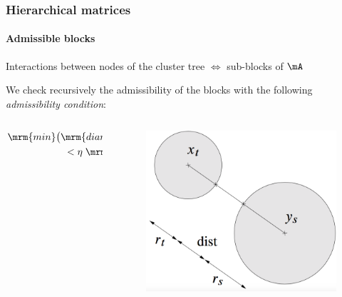\begin{frame}
\frametitle{Hierarchical matrices}
\framesubtitle{Admissible blocks }

Interactions between nodes of the cluster tree $\Leftrightarrow$ sub-blocks of $\mA$
\bigskip


We check recursively the admissibility of the blocks with the following \emph{admissibility condition}:
\begin{columns}
\begin{column}{0.5\textwidth}
\begin{align*}
\mrm{min}\big( \mrm{diam}(\mB_{t}),\mrm{diam}(\mB_{s})\big) \\
< \eta\;\mrm{dist}(\mrm{B}_{t},\mrm{B}_{s})
\end{align*}
\end{column}
\begin{column}{0.5\textwidth}
\begin{figure}
\includegraphics[width=0.9\columnwidth]{../images/cercles.png}
\end{figure}
\end{column}
\end{columns}
\end{frame}


